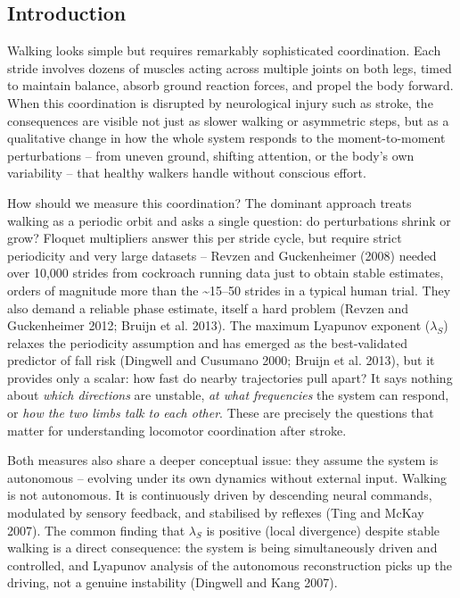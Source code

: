 \documentclass[
  letterpaper,
  DIV=11,
  numbers=noendperiod]{scrartcl}
\begin{document}
\subsection{Introduction}\label{introduction}

Walking looks simple but requires remarkably sophisticated coordination.
Each stride involves dozens of muscles acting across multiple joints on
both legs, timed to maintain balance, absorb ground reaction forces, and
propel the body forward. When this coordination is disrupted by
neurological injury such as stroke, the consequences are visible not
just as slower walking or asymmetric steps, but as a qualitative change
in how the whole system responds to the moment-to-moment perturbations
-- from uneven ground, shifting attention, or the body's own variability
-- that healthy walkers handle without conscious effort.

How should we measure this coordination? The dominant approach treats
walking as a periodic orbit and asks a single question: do perturbations
shrink or grow? Floquet multipliers answer this per stride cycle, but
require strict periodicity and very large datasets -- Revzen and
Guckenheimer (2008) needed over 10,000 strides from cockroach running
data just to obtain stable estimates, orders of magnitude more than the
\textasciitilde15--50 strides in a typical human trial. They also demand
a reliable phase estimate, itself a hard problem (Revzen and
Guckenheimer 2012; Bruijn et al. 2013). The maximum Lyapunov exponent
(\(\lambda_S\)) relaxes the periodicity assumption and has emerged as
the best-validated predictor of fall risk (Dingwell and Cusumano 2000;
Bruijn et al. 2013), but it provides only a scalar: how fast do nearby
trajectories pull apart? It says nothing about \emph{which directions}
are unstable, \emph{at what frequencies} the system can respond, or
\emph{how the two limbs talk to each other}. These are precisely the
questions that matter for understanding locomotor coordination after
stroke.

Both measures also share a deeper conceptual issue: they assume the
system is autonomous -- evolving under its own dynamics without external
input. Walking is not autonomous. It is continuously driven by
descending neural commands, modulated by sensory feedback, and
stabilised by reflexes (Ting and McKay 2007). The common finding that
\(\lambda_S\) is positive (local divergence) despite stable walking is a
direct consequence: the system is being simultaneously driven and
controlled, and Lyapunov analysis of the autonomous reconstruction picks
up the driving, not a genuine instability (Dingwell and Kang 2007).
\end{document}
